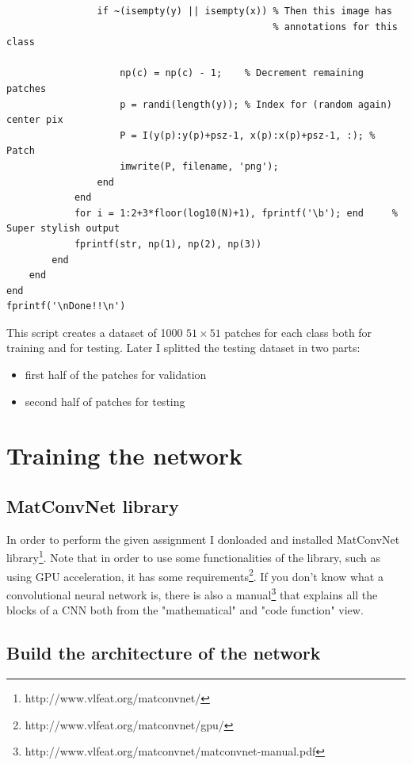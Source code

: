 \documentclass[]{report}
\begin{document}
\begin{lstlisting}
                if ~(isempty(y) || isempty(x)) % Then this image has 
                                               % annotations for this class 
               
                    np(c) = np(c) - 1;    % Decrement remaining patches
                    p = randi(length(y)); % Index for (random again) center pix
                    P = I(y(p):y(p)+psz-1, x(p):x(p)+psz-1, :); % Patch
                    imwrite(P, filename, 'png');
                end  
            end
            for i = 1:2+3*floor(log10(N)+1), fprintf('\b'); end     % Super stylish output
            fprintf(str, np(1), np(2), np(3))
        end
    end
end
fprintf('\nDone!!\n')

\end{lstlisting}

This script creates a dataset of 1000 $ 51\times51 $ patches for each class both for training and for testing. Later I splitted the testing dataset in two parts:
\begin{itemize}
\item first half of the patches for validation
\item second half of patches for testing

\end{itemize}   

\chapter{Training the network}

\section{MatConvNet library}

In order to perform the given assignment I donloaded and installed MatConvNet library\footnote{http://www.vlfeat.org/matconvnet/}. Note that in order to use some functionalities of the library, such as using GPU acceleration, it has some requirements\footnote{http://www.vlfeat.org/matconvnet/gpu/}.
If you don't know what a convolutional neural network is, there is also a manual\footnote{http://www.vlfeat.org/matconvnet/matconvnet-manual.pdf} that explains all the blocks of a CNN both from the "mathematical" and "code function" view.  

\section{Build the architecture of the network}
\end{document}
